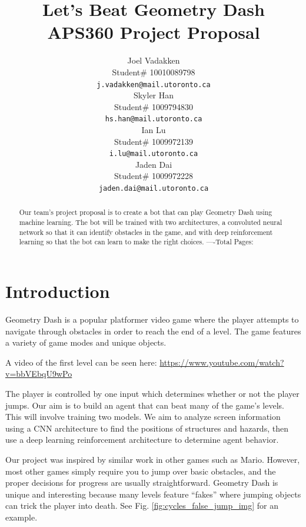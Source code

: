 \documentclass{article} %
\title{Let's Beat Geometry Dash  \\ 
APS360 Project Proposal}
\author{Joel Vadakken  \\
Student\# 10010089798\\
\texttt{j.vadakken@mail.utoronto.ca} \\
\And
Skyler Han  \\
Student\# 1009794830 \\
\texttt{hs.han@mail.utoronto.ca} \\
\AND
Ian Lu  \\
Student\# 1009972139 \\
\texttt{i.lu@mail.utoronto.ca} \\
\And
Jaden Dai \\
Student\# 1009972228 \\
\texttt{jaden.dai@mail.utoronto.ca} \\
\AND
}
\begin{document}
\maketitle

\begin{abstract}
Our team's project proposal is to create a bot that can play 
Geometry Dash using machine learning. The bot will be trained
with two architectures, a convoluted neural network so that it
can identify obstacles in the game, and with deep reinforcement
learning so that the bot can learn to make the right choices.
----Total Pages: \pageref{last_page}
\end{abstract}



\section{Introduction}

Geometry Dash is a popular platformer video game 
where the player attempts to navigate through 
obstacles in order to reach the end of a level. 
The game features a variety of game modes and 
unique objects.

A video of the first level can be seen here:
\href{https://www.youtube.com/watch?v=bbVEbqU9wPo}{https://www.youtube.com/watch?v=bbVEbqU9wPo} 

The player is controlled by one input which 
determines whether or not the player jumps. 
Our aim is to build an agent that can beat many 
of the game’s levels. This will involve training 
two models. We aim to analyze screen information 
using a CNN architecture to find the positions 
of structures and hazards, then use a deep 
learning reinforcement architecture to determine 
agent behavior.

Our project was inspired by similar work in other
games such as Mario. However, most other games 
simply require you to jump over basic obstacles,
and the proper decisions for progress are usually 
straightforward. Geometry Dash is unique and 
interesting because many levels feature “fakes” 
where jumping objects can trick the player into death.
See Fig. \ref{fig:cycles_false_jump_img} for an example. 
\end{document}
